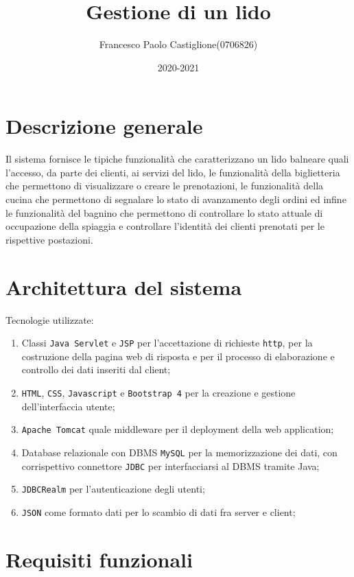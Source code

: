 \documentclass{article}
\title{Gestione di un lido}
\author{Francesco Paolo Castiglione(0706826)}
\date{2020-2021}
\begin{document}
\maketitle
\section{Descrizione generale}
Il sistema fornisce le tipiche funzionalità che caratterizzano un lido balneare quali l'accesso, da parte dei clienti, ai servizi del lido, le funzionalità della biglietteria che permettono di visualizzare o creare le prenotazioni, le funzionalità della cucina che permettono di segnalare lo stato di avanzamento degli ordini ed infine le funzionalità del bagnino che permettono di controllare lo stato attuale di occupazione della spiaggia e controllare l'identità dei clienti prenotati per le rispettive postazioni. 

\section{Architettura del sistema}

Tecnologie utilizzate:
\begin{enumerate}
	\item Classi \texttt{Java Servlet} e \texttt{JSP} per l'accettazione di richieste \texttt{http}, per la costruzione della pagina web di risposta e per il processo di elaborazione e controllo dei dati inseriti dal client;
	\item \texttt{HTML}, \texttt{CSS},  \texttt{Javascript} e \texttt{Bootstrap 4} per la creazione e gestione dell'interfaccia utente;
	\item \texttt{Apache Tomcat} quale middleware per il deployment della web application;
	\item Database relazionale con DBMS \texttt{MySQL} per la memorizzazione dei dati, con corrispettivo connettore \texttt{JDBC} per interfacciarsi al DBMS tramite Java;
	\item \texttt{JDBCRealm} per l'autenticazione degli utenti;
	\item \texttt{JSON} come formato dati per lo scambio di dati fra server e client;
\end{enumerate}

\newpage
\section{Requisiti funzionali}
\end{document}
